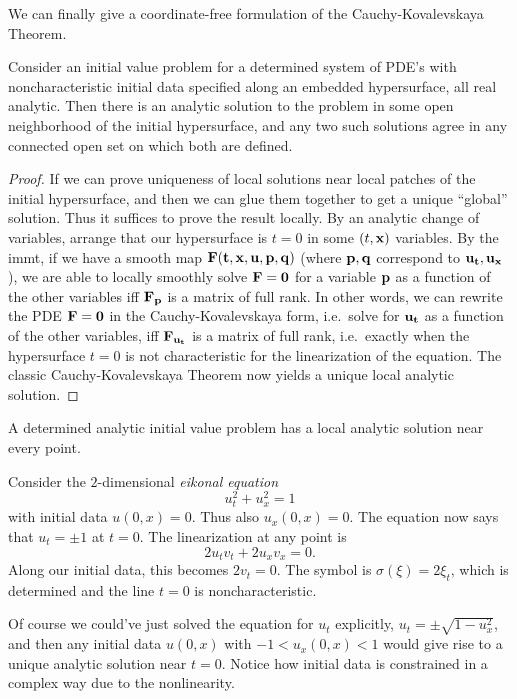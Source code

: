We can finally give a coordinate-free formulation of the Cauchy-Kovalevskaya Theorem.

\begin{thm}
    Consider an initial value problem for a determined system of PDE's with noncharacteristic initial data specified along an embedded hypersurface, all real analytic. Then there is an analytic solution to the problem in some open neighborhood of the initial hypersurface, and any two such solutions agree in any connected open set on which both are defined.
\end{thm}
\begin{proof}
    If we can prove uniqueness of local solutions near local patches of the initial hypersurface, and then we can glue them together to get a unique ``global'' solution. Thus it suffices to prove the result locally. By an analytic change of variables, arrange that our hypersurface  is $t=0$ in some $(t,\bf{x})$ variables. By the \gls{immt}, if we have a smooth map $\bf{F}(t,\bf{x},\bf{u},\bf{p},\bf{q})$ (where $\bf{p},\bf{q}$ correspond to $\bf{u}_t,\bf{u}_{\bf x}$), we are able to locally smoothly solve $\bf{F}=0$ for a variable $\bf{p}$ as a function of the other variables iff $\bf{F}_{\bf{p}}$ is a matrix of full rank. In other words, we can rewrite the PDE $\bf{F}=0$ in the Cauchy-Kovalevskaya form, i.e.\ solve for $\bf{u}_t$ as a function of the other variables, iff $\bf{F}_{\bf{u}_t}$ is a matrix of full rank, i.e.\ exactly when the hypersurface $t=0$ is not characteristic for the linearization of the equation. The classic Cauchy-Kovalevskaya Theorem now yields a unique local analytic solution.
\end{proof}
\begin{cor}
    A determined analytic initial value problem has a local analytic solution near every point.
\end{cor}

\begin{example}
    Consider the $2$-dimensional \emph{eikonal equation} 
    \[u_t^2+u_x^2=1\]
    with initial data $u(0,x)=0$. Thus also $u_x(0,x)=0$. The equation now says that $u_t=\pm 1$ at $t=0$. The linearization at any point is 
    \[2u_t v_t+2u_x v_x=0.\]
    Along our initial data, this becomes $2v_t=0$. The symbol is $\sigma(\xi)=2\xi_t$, which is determined and the line $t=0$ is noncharacteristic. 

    Of course we could've just solved the equation for $u_t$ explicitly, $u_t=\pm \sqrt{1-u_x^2}$, and then any initial data $u(0,x)$ with $-1<u_x(0,x)<1$ would give rise to a unique analytic solution near $t=0$. Notice how initial data is constrained in a complex way due to the nonlinearity.
\end{example}

